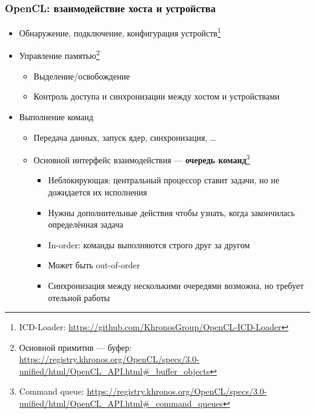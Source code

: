 \documentclass[xcolor=table,aspectratio=169]{beamer}
\begin{document}
\begin{frame}[fragile]
  \frametitle{OpenCL: взаимодействие хоста и устройства}
  \begin{itemize}
    \item Обнаружение, подключение, конфигурация устройств\footnote{ICD-Loader: \url{https://github.com/KhronosGroup/OpenCL-ICD-Loader}}
    \item Управление памятью\footnote{Основной примитив --- буфер: \url{https://registry.khronos.org/OpenCL/specs/3.0-unified/html/OpenCL_API.html\#_buffer_objects}}
    \begin{itemize}
      \item Выделение/освобождение
      \item Контроль доступа и синхронизации между хостом и устройствами
    \end{itemize} 
    \item Выполнение команд 
    \begin{itemize}
      \item Передача данных, запуск ядер, синхронизация, \ldots
      \item Основной интерфейс взаимодействия --- \textbf{очередь команд}\footnote{Command queue: \url{https://registry.khronos.org/OpenCL/specs/3.0-unified/html/OpenCL_API.html\#_command_queues}}
      \begin{itemize}
        \item Неблокирующая: центральный процессор ставит задачи, но не дожидается их исполнения
        \item Нужны дополнительные действия чтобы узнать, когда закончилась определённая задача
        \item In-order: команды выполняются строго друг за другом
        \item Может быть out-of-order
        \item Синхронизация между несколькими очередями возможна, но требует отельной работы
      \end{itemize}
    \end{itemize} 
  \end{itemize}

\end{frame}
\end{document}
